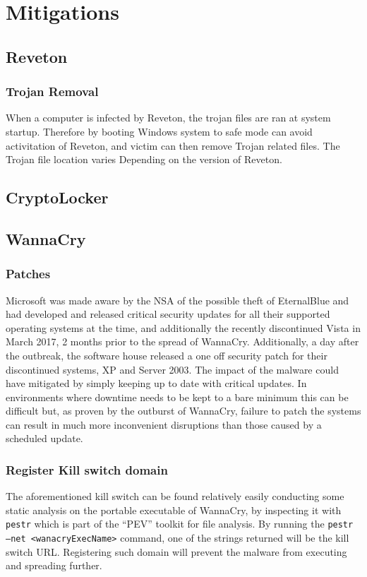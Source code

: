 \documentclass[10pt,a4paper]{article}
\begin{document}
\section{Mitigations}

\subsection{Reveton}

\subsubsection{Trojan Removal}
When a computer is infected by Reveton, the trojan files are ran at system startup. Therefore by booting Windows system to safe mode can avoid activitation of Reveton, and victim can then remove Trojan related files. The Trojan file location varies Depending on the version of Reveton.

\subsection{CryptoLocker}

\subsection{WannaCry}

\subsubsection{Patches}
Microsoft was made aware by the NSA of the possible theft of EternalBlue and had developed and released critical security updates for all their supported operating systems at the time, and additionally the recently discontinued Vista in March 2017, 2 months prior to the spread of WannaCry.
Additionally, a day after the outbreak, the software house released a one off security patch for their discontinued systems, XP and Server 2003.
The impact of the malware could have mitigated by simply keeping up to date with critical updates. In environments where downtime needs to be kept to a bare minimum this can be difficult but, as proven by the outburst of WannaCry, failure to patch the systems can result in much more inconvenient disruptions than those caused by a scheduled update.

\subsubsection{Register Kill switch domain}
The aforementioned kill switch can be found relatively easily conducting some static analysis on the portable executable of WannaCry, by inspecting it with \texttt{pestr} which is part of the ``PEV'' toolkit for file analysis. By running the \texttt{pestr --net <wanacryExecName>} command, one of the strings returned will be the kill switch URL. Registering such domain will prevent the malware from executing and spreading further.
\end{document}
